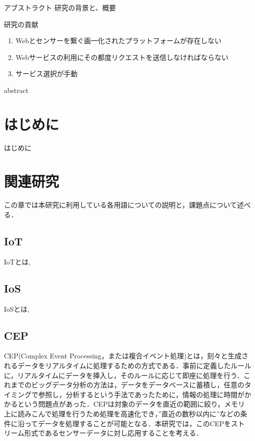 \documentclass{kuisthesis}			%
\date{平成28年2月6日}				%
\begin{document}
\maketitle					%

\begin{jabstract}				%
アブストラクト
研究の背景と、概要

研究の貢献
\begin{enumerate}
\item
Webとセンサーを繋ぐ画一化されたプラットフォームが存在しない
\item
Webサービスの利用にその都度リクエストを送信しなければならない
\item
サービス選択が手動
\end{enumerate}
\end{jabstract}
\begin{eabstract}				%
abstract
\end{eabstract}

\tableofcontents				%

\section{はじめに}\label{sec-intro}		%
はじめに

\section{関連研究}\label{sec-structure}
この章では本研究に利用している各用語についての説明と，課題点について述べる．

\subsection{IoT}\label{subsec-abstract}
IoTとは,

\subsection{IoS}\label{subsec-abstract}
IoSとは,

\subsection{CEP}
CEP(Complex Event Processing，または複合イベント処理)とは，刻々と生成されるデータをリアルタイムに処理するための方式である．事前に定義したルールに，リアルタイムにデータを挿入し，そのルールに応じて即座に処理を行う．これまでのビッグデータ分析の方法は，データをデータベースに蓄積し，任意のタイミングで参照し，分析するという手法であったために，情報の処理に時間がかかるという問題点があった．CEPは対象のデータを直近の範囲に絞り，メモリ上に読みこんで処理を行うため処理を高速化でき，”直近の数秒以内に”などの条件に沿ってデータを処理することが可能となる．本研究では，このCEPをストリーム形式であるセンサーデータに対し応用することを考える．
\end{document}
